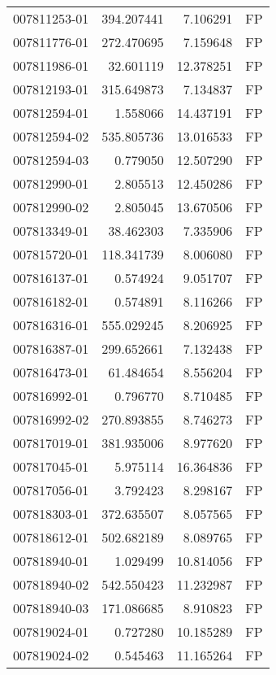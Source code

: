 \begin{tabular}{lrrl}
007811253-01 &  394.207441 &       7.106291 &   FP \\
007811776-01 &  272.470695 &       7.159648 &   FP \\
007811986-01 &   32.601119 &      12.378251 &   FP \\
007812193-01 &  315.649873 &       7.134837 &   FP \\
007812594-01 &    1.558066 &      14.437191 &   FP \\
007812594-02 &  535.805736 &      13.016533 &   FP \\
007812594-03 &    0.779050 &      12.507290 &   FP \\
007812990-01 &    2.805513 &      12.450286 &   FP \\
007812990-02 &    2.805045 &      13.670506 &   FP \\
007813349-01 &   38.462303 &       7.335906 &   FP \\
007815720-01 &  118.341739 &       8.006080 &   FP \\
007816137-01 &    0.574924 &       9.051707 &   FP \\
007816182-01 &    0.574891 &       8.116266 &   FP \\
007816316-01 &  555.029245 &       8.206925 &   FP \\
007816387-01 &  299.652661 &       7.132438 &   FP \\
007816473-01 &   61.484654 &       8.556204 &   FP \\
007816992-01 &    0.796770 &       8.710485 &   FP \\
007816992-02 &  270.893855 &       8.746273 &   FP \\
007817019-01 &  381.935006 &       8.977620 &   FP \\
007817045-01 &    5.975114 &      16.364836 &   FP \\
007817056-01 &    3.792423 &       8.298167 &   FP \\
007818303-01 &  372.635507 &       8.057565 &   FP \\
007818612-01 &  502.682189 &       8.089765 &   FP \\
007818940-01 &    1.029499 &      10.814056 &   FP \\
007818940-02 &  542.550423 &      11.232987 &   FP \\
007818940-03 &  171.086685 &       8.910823 &   FP \\
007819024-01 &    0.727280 &      10.185289 &   FP \\
007819024-02 &    0.545463 &      11.165264 &   FP \\

\end{tabular}

